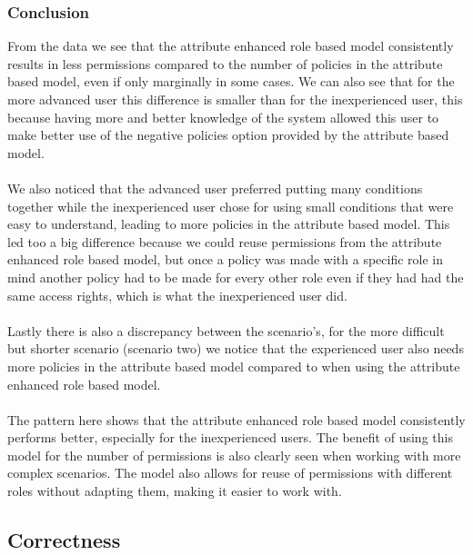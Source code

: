 \subsubsection{Conclusion}

From the data we see that the attribute enhanced role based model consistently results in less permissions compared to the number of policies in the attribute based model, even if only marginally in some cases.
We can also see that for the more advanced user this difference is smaller than for the inexperienced user, this because having more and better knowledge of the system allowed this user to make better use of the negative policies option provided by the attribute based model.
\\
\\
We also noticed that the advanced user preferred putting many conditions together while the inexperienced user chose for using small conditions that were easy to understand, leading to more policies in the attribute based model.
This led too a big difference because we could reuse permissions from the attribute enhanced role based model, but once a policy was made with a specific role in mind another policy had to be made for every other role even if they had had the same access rights, which is what the inexperienced user did.
\\
\\
Lastly there is also a discrepancy between the scenario's, for the more difficult but shorter scenario (scenario two) we notice that the experienced user also needs more policies in the attribute based model compared to when using the attribute enhanced role based model. 
\\
\\
The pattern here shows that the attribute enhanced role based model consistently performs better, especially for the inexperienced users.
The benefit of using this model for the number of permissions is also clearly seen when working with more complex scenarios.
The model also allows for reuse of permissions with different roles without adapting them, making it easier to work with.

\clearpage


\subsection{Correctness}

